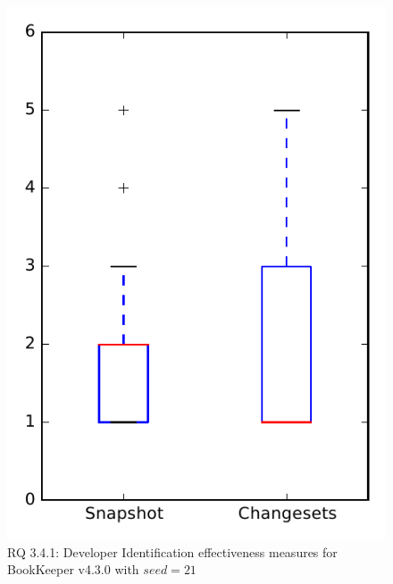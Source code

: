 
\begin{figure}
\centering
\includegraphics[height=0.4\textheight]{figures/dit_seed/rq1_bookkeeper_21}
\caption{RQ 3.4.1: Developer Identification effectiveness measures for BookKeeper v4.3.0 with $seed=21$}
\label{fig:dit_seed:rq1:bookkeeper}
\end{figure}
